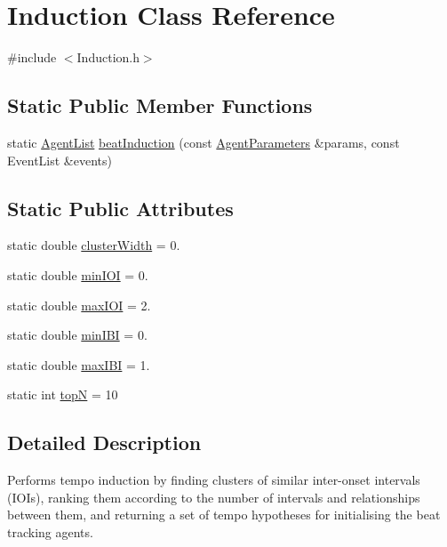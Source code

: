 \hypertarget{class_induction}{}\section{Induction Class Reference}
\label{class_induction}


{\ttfamily \#include $<$Induction.\+h$>$}

\subsection*{Static Public Member Functions}
\begin{DoxyCompactItemize}
\item 
static \hyperlink{class_agent_list}{Agent\+List} \hyperlink{class_induction_ad6cfd2e62ae5262273d83a0b858bee33}{beat\+Induction} (const \hyperlink{class_agent_parameters}{Agent\+Parameters} \&params, const Event\+List \&events)
\end{DoxyCompactItemize}
\subsection*{Static Public Attributes}
\begin{DoxyCompactItemize}
\item 
static double \hyperlink{class_induction_a2ab726717d99a6edb75bcd47c4ecdec4}{cluster\+Width} = 0.
\item 
static double \hyperlink{class_induction_a79992fbf54461174a5b7113397210c0a}{min\+I\+OI} = 0.
\item 
static double \hyperlink{class_induction_ab279072ddf4b9340c14a90622513f52a}{max\+I\+OI} = 2.
\item 
static double \hyperlink{class_induction_ae8c5b515b4df99e1c1003f42f9f5c13a}{min\+I\+BI} = 0.
\item 
static double \hyperlink{class_induction_a4f369d04b9ef6a70b1da601489d8b859}{max\+I\+BI} = 1.
\item 
static int \hyperlink{class_induction_ae128800b79984f390a9a00a7850e6f7d}{topN} = 10
\end{DoxyCompactItemize}


\subsection{Detailed Description}
Performs tempo induction by finding clusters of similar inter-\/onset intervals (I\+O\+Is), ranking them according to the number of intervals and relationships between them, and returning a set of tempo hypotheses for initialising the beat tracking agents. 

